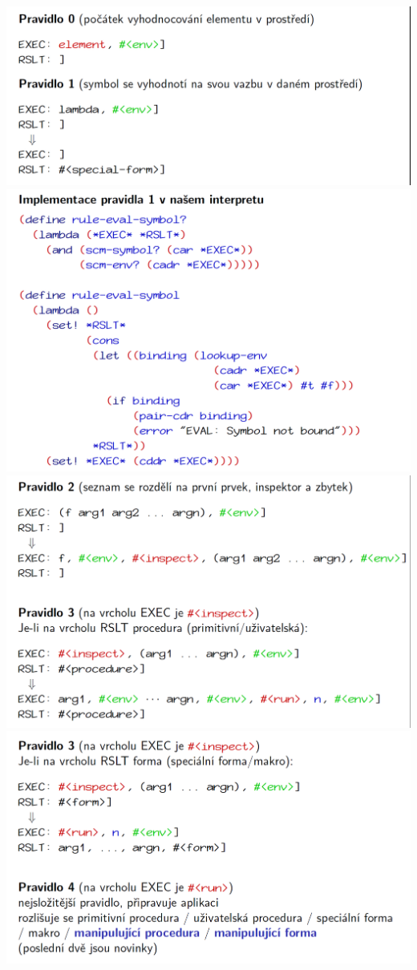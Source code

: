 \documentclass[10pt,a4paper]{article}
\begin{document}
\begin{center}
	\includegraphics[scale=0.3]{img/zasobnikovy_model_7}
	\includegraphics[scale=0.3]{img/zasobnikovy_model_8}
	\includegraphics[scale=0.3]{img/zasobnikovy_model_9}
	\includegraphics[scale=0.3]{img/zasobnikovy_model_10}

\end{center}
\end{document}

